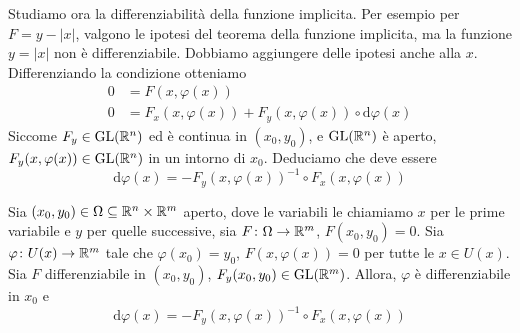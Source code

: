 \documentclass[a4paper]{article}
\begin{document}
\begin{radioactive}
Studiamo ora la differenziabilità della funzione implicita.
Per esempio per \(F = y - |x|\),
valgono le ipotesi del teorema della funzione implicita, ma la funzione
\(y=|x|\) non è differenziabile.
Dobbiamo aggiungere delle ipotesi anche alla \(x\).
Differenziando la condizione otteniamo
\begin{align*}
    0 &= F(x, \varphi(x)) \\
    0 &= F_x(x, \varphi(x)) + F_y(x, \varphi(x)) \circ \text{d}\varphi(x)
\end{align*}
Siccome \(F_y \in \text{GL}(\mathbb{R}^n)\) ed è continua in \((x_0, y_0)\),
e \(\text{GL}(\mathbb{R}^n)\) è aperto,
\(F_y(x, \varphi(x)) \in \text{GL}(\mathbb{R}^n)\)
in un intorno di \(x_0\).
Deduciamo che deve essere
\[
    \text{d}\varphi(x) = -F_y(x, \varphi(x))^{-1} \circ F_x(x, \varphi(x))
\]
\end{radioactive}

\begin{radioactive}
\begin{snippettheorem}{}
    Sia \((x_0, y_0) \in \Omega \subseteq \mathbb{R}^n \times \mathbb{R}^m\) aperto,
    dove le variabili le chiamiamo \(x\) per le prime variabile e \(y\) per quelle successive,
    sia \(F \colon \Omega \to \mathbb{R}^m\), \(F(x_0, y_0) = 0\).
    Sia \(\varphi \colon U(x) \to \mathbb{R}^m\)
    tale che \(\varphi(x_0) = y_0\), \(F(x, \varphi(x)) = 0\)
    per tutte le \(x \in U(x)\). Sia \(F\) differenziabile in \((x_0, y_0)\),
    \(F_y(x_0, y_0) \in \text{GL}(\mathbb{R}^m)\).
    Allora, \(\varphi\) è differenziabile in \(x_0\) e \[
        \text{d}\varphi(x) = -F_y(x, \varphi(x))^{-1} \circ F_x(x, \varphi(x))
    \]
\end{snippettheorem}
\end{radioactive}
\end{document}
